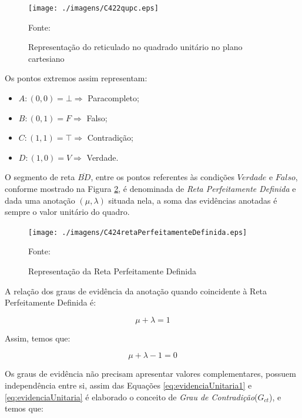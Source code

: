 \begin{figure}[!htb]
\caption{Representação do reticulado no quadrado unitário no plano cartesiano}
\center\texttt{[image: ./imagens/C422qupc.eps]}
\label{fig:reticuladoQUPC}

{\small Fonte: \cite{JoaoInacio} }
\end{figure}

Os pontos extremos assim representam:

\begin{itemize}
\item $A: (0,0) = \bot \Rightarrow $ Paracompleto;
\item $B: (0,1) = F \Rightarrow $ Falso;
\item $C: (1,1) = \top \Rightarrow $ Contradição;
\item $D: (1,0) = V \Rightarrow $ Verdade.
\end{itemize}

O segmento de reta $\overline{BD}$, entre os pontos referentes às condições $Verdade$ e $Falso$, conforme mostrado na Figura \ref{fig:retaPerfeitamenteDefinida}, é denominada de \emph{Reta Perfeitamente Definida} e dada uma anotação $(\mu, \lambda )$ situada nela, a soma das evidências anotadas é sempre o valor unitário do quadro. 

\begin{figure}[!htb]
\caption{Representação da Reta Perfeitamente Definida}
\center\texttt{[image: ./imagens/C424retaPerfeitamenteDefinida.eps]}
\label{fig:retaPerfeitamenteDefinida}

{\small Fonte: \cite{JoaoInacio}}
\end{figure}

A relação dos graus de evidência da anotação quando coincidente à Reta Perfeitamente Definida é: 

\begin{center}
\begin{equation}
\mu + \lambda = 1
\label{eq:evidenciaUnitaria1}
\end{equation}
\end{center}

Assim, temos que:

\begin{center}
\begin{equation}
\mu + \lambda - 1 = 0
\label{eq:evidenciaUnitaria}
\end{equation}
\end{center}


Os graus de evidência não precisam apresentar valores complementares, possuem independência entre si, assim das Equações  
\ref{eq:evidenciaUnitaria1} e 
\ref{eq:evidenciaUnitaria} 
é elaborado o conceito de 
\emph{Grau de Contradição}($G_{ct}$), 
e temos que: 

